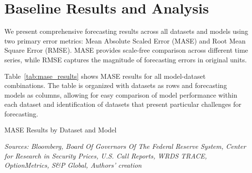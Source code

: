 \documentclass{article}
\begin{document}
\section{Baseline Results and Analysis}
\label{sec:results}


We present comprehensive forecasting results across all datasets and models using two primary error metrics: Mean Absolute Scaled Error (MASE) and Root Mean Square Error (RMSE). MASE provides scale-free comparison across different time series, while RMSE captures the magnitude of forecasting errors in original units.

Table~\ref{tab:mase_results} shows MASE results for all model-dataset combinations. The table is organized with datasets as rows and forecasting models as columns, allowing for easy comparison of model performance within each dataset and identification of datasets that present particular challenges for forecasting.

\begin{table}[htbp]
\centering
\caption{MASE Results by Dataset and Model}
\label{tab:mase_results}

\caption*{
\scriptsize
\emph{Sources: Bloomberg, Board Of Governors Of The Federal Reserve System, Center for Research in Security Prices, U.S. Call Reports, WRDS TRACE, OptionMetrics, S\&P Global,  Authors' creation}}
\end{table}


\end{document}
